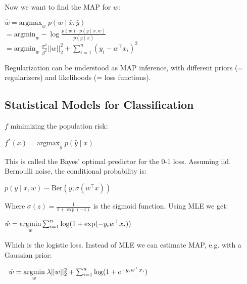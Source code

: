 Now we want to find the MAP for $w$:

$\hat w = \text{argmax}_w \; p(w \; | \; \bar x, \bar y) $ \\[-5pt]

\quad $= \text{argmin}_w - \log \frac{p(w) \cdot p( y \; | \; x, w)}{p( y \; | \; x)} $ \\[-5pt]

\quad $= \text{argmin}_w \; \frac{\sigma^2}{\beta^2} ||w||_2^2 + \sum_{i=1}^n(y_i - w^\top x_i)^2$

Regularization can be understood as MAP inference, with different priors (= regularizers) and likelihoods (= loss functions).

\subsection*{Statistical Models for Classification}

$f$ minimizing the population risk:

\qquad \qquad $f^*(x) = \text{argmax}_{\hat y} \; p(\hat y \; | \; x)$

This is called the Bayes' optimal predictor for the 0-1 loss. Assuming iid. Bernoulli noise, the conditional probability is:

\qquad \qquad$p(y \; | \; x,w) \sim \text{Ber}(y; \sigma(w^\top x))$

Where $\sigma(z) = \frac{1}{1 + \exp(-z)}$ is the sigmoid function. Using MLE we get:

\quad \;$\hat w = \underset{w}{\text{argmin}} \sum_{i = 1}^n \log (1 + \exp(-y_i w^\top x_i))$

Which is the logistic loss. Instead of MLE we can estimate MAP, e.g. with a Gaussian prior:

$\; \;\hat w = \underset{w}{\text{argmin}} \; \lambda ||w||_2^2 + \sum_{i = 1}^n \log (1 + e^{-y_i w^\top x_i})$






